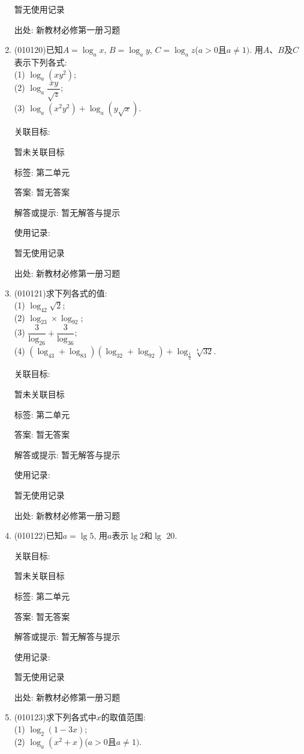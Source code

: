 \documentclass[10pt,a4paper]{article}
\begin{document}
\begin{enumerate}[1.]
暂无使用记录


出处: 新教材必修第一册习题
\item { (010120)}已知$A=\log_ax$, $B=\log_ay$, $C=\log_az$($a>0$且$a\ne 1)$. 用$A$、$B$及$C$表示下列各式:\\
(1) $\log_a(xy^2)$;\\
(2) $\log_a\dfrac{xy}{\sqrt z}$;\\
(3) $\log_a(x^2y^2)+\log_a(y\sqrt x)$.


关联目标:

暂未关联目标



标签: 第二单元

答案: 暂无答案

解答或提示: 暂无解答与提示

使用记录:

暂无使用记录


出处: 新教材必修第一册习题
\item { (010121)}求下列各式的值:\\
(1) $\log_42\sqrt 2$;\\
(2) $\log_23\times \log_92$;\\
(3) $\dfrac 3{\log_26}+\dfrac 3{\log_36}$;\\
(4) $(\log_43+\log_83)(\log_32+\log_92)+\log_{\frac 12}\sqrt[4]{32}$.


关联目标:

暂未关联目标



标签: 第二单元

答案: 暂无答案

解答或提示: 暂无解答与提示

使用记录:

暂无使用记录


出处: 新教材必修第一册习题
\item { (010122)}已知$a=\lg 5$, 用$a$表示$\lg 2$和$\lg$ $20$.


关联目标:

暂未关联目标



标签: 第二单元

答案: 暂无答案

解答或提示: 暂无解答与提示

使用记录:

暂无使用记录


出处: 新教材必修第一册习题
\item { (010123)}求下列各式中$x$的取值范围:\\
(1) $\log_2(1-3x)$;\\
(2) $\log_a(x^2+x)$($a>0$且$a\ne 1)$.



\end{enumerate}
\end{document}
